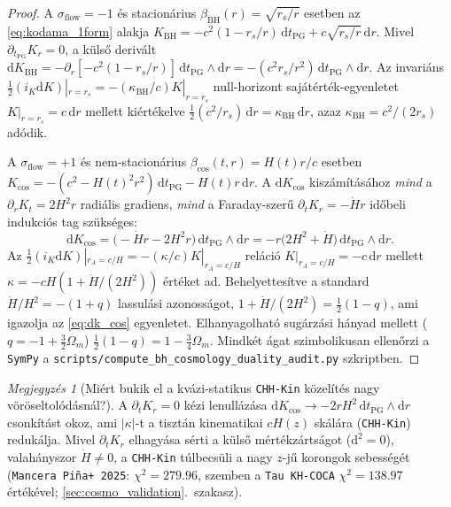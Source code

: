 \documentclass[11pt,a4paper]{article}
\theoremstyle{remark}
\newtheorem{remark}[theorem]{Megjegyz\'es}
\begin{document}
\begin{proof}
A $\sigma_{\mathrm{flow}} = -1$ \'es stacion\'arius $\beta_{\mathrm{BH}}(r) = \sqrt{r_s/r}$ esetben az \eqref{eq:kodama_1form} alakja $K_{\mathrm{BH}} = -c^2(1 - r_s/r)\,\mathrm{d}t_{\mathrm{PG}} + c\sqrt{r_s/r}\,\mathrm{d}r$. Mivel $\partial_{t_{\mathrm{PG}}} K_r = 0$, a k\"uls\H{o} deriv\'alt $\mathrm{d}K_{\mathrm{BH}} = -\partial_r[-c^2(1 - r_s/r)]\,\mathrm{d}t_{\mathrm{PG}}\wedge\mathrm{d}r = -(c^2 r_s/r^2)\,\mathrm{d}t_{\mathrm{PG}}\wedge\mathrm{d}r$. Az invari\'ans $\frac{1}{2}(i_K \mathrm{d}K)|_{r=r_s} = -(\kappa_{\mathrm{BH}}/c)K|_{r=r_s}$ null-horizont saj\'at\'ert\'ek-egyenletet $K|_{r=r_s} = c\,\mathrm{d}r$ mellett ki\'ert\'ekelve $\frac{1}{2}(c^2/r_s)\,\mathrm{d}r = \kappa_{\mathrm{BH}}\,\mathrm{d}r$, azaz $\kappa_{\mathrm{BH}} = c^2/(2r_s)$ ad\'odik.

A $\sigma_{\mathrm{flow}} = +1$ \'es nem-stacion\'arius $\beta_{\mathrm{cos}}(t, r) = H(t)r/c$ esetben $K_{\mathrm{cos}} = -(c^2 - H(t)^2 r^2)\,\mathrm{d}t_{\mathrm{PG}} - H(t)r\,\mathrm{d}r$. A $\mathrm{d}K_{\mathrm{cos}}$ kisz\'am\'it\'as\'ahoz \emph{mind} a $\partial_r K_t = 2H^2 r$ radi\'alis gradiens, \emph{mind} a Faraday-szer\H{u} $\partial_t K_r = -\dot{H}r$ id\H{o}beli indukci\'os tag sz\"uks\'eges:
\[
  \mathrm{d}K_{\mathrm{cos}} = \bigl(-\dot{H}r - 2H^2 r\bigr)\,\mathrm{d}t_{\mathrm{PG}} \wedge \mathrm{d}r = -r\bigl(2H^2 + \dot{H}\bigr)\,\mathrm{d}t_{\mathrm{PG}} \wedge \mathrm{d}r.
\]
Az $\frac{1}{2}(i_K\mathrm{d}K)|_{r_A = c/H} = -(\kappa/c)K|_{r_A = c/H}$ rel\'aci\'o $K|_{r_A = c/H} = -c\,\mathrm{d}r$ mellett $\kappa = -cH(1 + \dot{H}/(2H^2))$ \'ert\'eket ad. Behelyettes\'itve a standard $\dot{H}/H^2 = -(1 + q)$ lassul\'asi azonoss\'agot, $1 + \dot{H}/(2H^2) = \frac{1}{2}(1 - q)$, ami igazolja az \eqref{eq:dk_cos} egyenletet. Elhanyagolhat\'o sug\'arz\'asi h\'anyad mellett ($q = -1 + \frac{3}{2}\Omega_m$) $\frac{1}{2}(1 - q) = 1 - \frac{3}{4}\Omega_m$. Mindk\'et \'agat szimbolikusan ellen\H{o}rzi a \texttt{SymPy} a \texttt{scripts/\allowbreak compute\_\allowbreak bh\_\allowbreak cosmology\_\allowbreak duality\_\allowbreak audit.py} szkriptben.
\end{proof}

\begin{remark}[Mi\'ert bukik el a kv\'azi-statikus \texttt{CHH-Kin} k\"ozel\'it\'es nagy v\"or\"oseltol\'od\'asn\'al?]
A $\partial_t K_r = 0$ k\'ezi lenull\'az\'asa $\mathrm{d}K_{\mathrm{cos}} \to -2rH^2\,\mathrm{d}t_{\mathrm{PG}}\wedge\mathrm{d}r$ csonk\'it\'ast okoz, ami $|\kappa|$-t a tiszt\'an kinematikai $cH(z)$ sk\'al\'ara (\texttt{CHH-Kin}) reduk\'alja. Mivel $\partial_t K_r$ elhagy\'asa s\'erti a k\"uls\H{o} m\'ert\'ekz\'arts\'agot ($\mathrm{d}^2 = 0$), valah\'anyszor $\dot{H} \neq 0$, a \texttt{CHH-Kin} t\'ulbecs\"uli a nagy $z$-j\H{u} korongok sebess\'eg\'et (\texttt{Mancera Pi\~na+ 2025}: $\chi^2 = 279.96$, szemben a \texttt{Tau KH-COCA} $\chi^2 = 138.97$ \'ert\'ek\'evel; \ref{sec:cosmo_validation}.\ szakasz).
\end{remark}
\end{document}
